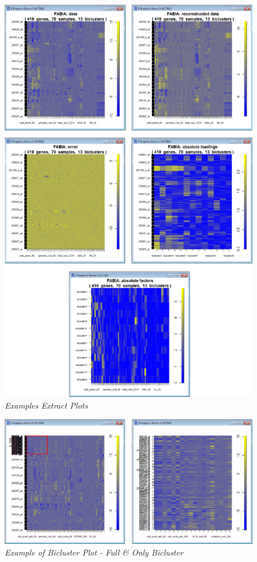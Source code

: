 \documentclass[a4paper]{article}\usepackage[]{graphicx}\usepackage[]{color}
\begin{document}
\begin{figure}[H]
\centering
\includegraphics[scale=0.3]{figures/fabiaplot_example3.png}
\caption{{\it Examples Extract Plots}\label{fabiaplot_example3}}
\end{figure}
\begin{figure}[H]
\centering
\includegraphics[scale=0.4]{figures/fabiaplot_example4.png}
\caption{{\it Example of Bicluster Plot - Full \&
Only Bicluster}\label{fabiaplot_example4}}
\end{figure}
\end{document}
